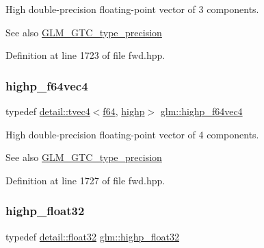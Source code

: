 High double-\/precision floating-\/point vector of 3 components. \begin{DoxySeeAlso}{See also}
\hyperlink{group__gtc__type__precision}{G\+L\+M\+\_\+\+G\+T\+C\+\_\+type\+\_\+precision} 
\end{DoxySeeAlso}


Definition at line 1723 of file fwd.\+hpp.

\mbox{\label{group__gtc__type__precision_ga1e9d8145fb9521701a5eeb6df5754184}} 
\subsubsection{\texorpdfstring{highp\+\_\+f64vec4}{highp\_f64vec4}}
{\footnotesize\ttfamily typedef \hyperlink{structglm_1_1detail_1_1tvec4}{detail\+::tvec4}$<$\hyperlink{group__gtc__type__precision_ga2bba392e555124b36cde6abba349bab3}{f64}, \hyperlink{namespaceglm_a0f04f086094c747d227af4425893f545ac6f7eab42eacbb10d59a58e95e362074}{highp}$>$ \hyperlink{group__gtc__type__precision_ga1e9d8145fb9521701a5eeb6df5754184}{glm\+::highp\+\_\+f64vec4}}

High double-\/precision floating-\/point vector of 4 components. \begin{DoxySeeAlso}{See also}
\hyperlink{group__gtc__type__precision}{G\+L\+M\+\_\+\+G\+T\+C\+\_\+type\+\_\+precision} 
\end{DoxySeeAlso}


Definition at line 1727 of file fwd.\+hpp.

\mbox{\label{group__gtc__type__precision_ga91af7513c1102410646f2c435ca29be5}} 
\subsubsection{\texorpdfstring{highp\+\_\+float32}{highp\_float32}}
{\footnotesize\ttfamily typedef \hyperlink{namespaceglm_1_1detail_ad60558c5c304624de0b54c51b5857737}{detail\+::float32} \hyperlink{group__gtc__type__precision_ga91af7513c1102410646f2c435ca29be5}{glm\+::highp\+\_\+float32}}


